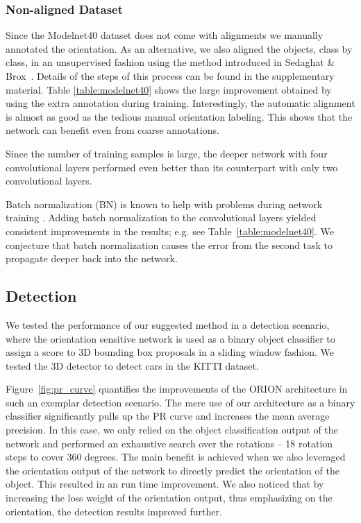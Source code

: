 \documentclass{bmvc2k}
\begin{document}
\subsubsection{Non-aligned Dataset}
Since the Modelnet40 dataset does not come with alignments we manually annotated the orientation. As an alternative, we also aligned the objects, class by class, in an unsupervised fashion using the method introduced in Sedaghat \& Brox~\cite{Sedaghat2015}. Details of the steps of this process can be found in the supplementary material. Table \ref{table:modelnet40} shows the large improvement obtained by using the extra annotation during training. Interestingly, the automatic alignment is almost as good as the tedious manual orientation labeling. This shows that the network can benefit even from coarse annotations. 

Since the number of training samples is large, the deeper network with four convolutional layers performed even better than its counterpart with only two convolutional layers.  

Batch normalization (BN) is known to help with problems during network training \cite{icml2015_ioffe15}. 
Adding batch normalization to the convolutional layers yielded consistent improvements in the results; e.g. see Table~\ref{table:modelnet40}. We conjecture that batch normalization causes the error from the second task to propagate deeper back into the network.

\subsection{Detection}
We tested the performance of our suggested method in a detection scenario, where the orientation sensitive network is used as a binary object classifier to assign a score to 3D bounding box proposals in a sliding window fashion. We tested the 3D detector to detect cars in the KITTI dataset. 

Figure~\ref{fig:pr_curve} quantifies the improvements of the ORION architecture in such an exemplar detection scenario. 
The mere use of our architecture as a binary classifier significantly pulls up the PR curve and increases the mean average precision. In this case, we only relied on the object classification output of the network and performed an exhaustive search over the rotations -- 18 rotation steps to cover 360 degrees. 
The main benefit is achieved when we also leveraged the orientation output of the network to directly predict the orientation of the object. This resulted in an  run time improvement.
We also noticed that by increasing the loss weight of the orientation output, thus emphasizing on the orientation, the detection results improved further.
\end{document}
